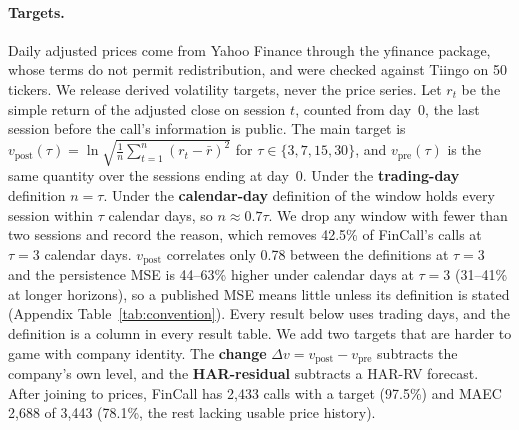 \paragraph{Targets.}
Daily adjusted prices come from Yahoo Finance through the yfinance package,
whose terms do not permit redistribution, and were checked against
Tiingo on 50 tickers. We release derived volatility targets, never the price
series. Let $r_t$ be the simple return of the adjusted close on session $t$, counted from day~0, the last
session before the call's information is public. The main target is
$v_{\mathrm{post}}(\tau)=\ln\sqrt{\frac{1}{n}\sum_{t=1}^{n}(r_t-\bar r)^2}$ for
$\tau\in\{3,7,15,30\}$, and $v_{\mathrm{pre}}(\tau)$ is the same quantity over the
sessions ending at day~0. Under the \textbf{trading-day} definition $n=\tau$. Under
the \textbf{calendar-day} definition of \citet{qin2019what} the window holds every
session within $\tau$ calendar days, so $n\approx0.7\tau$. We drop any window
with fewer than two sessions and record the reason, which removes 42.5\% of
FinCall's calls at $\tau{=}3$ calendar days. $v_{\mathrm{post}}$ correlates only
0.78 between the definitions at $\tau{=}3$ and the persistence MSE is 44--63\%
higher under calendar days at $\tau{=}3$ (31--41\% at longer horizons), so a published MSE means little unless its
definition is stated (Appendix Table~\ref{tab:convention}). Every result below
uses trading days, and the definition is a column in every result table. We add two targets
that are harder to game with company identity. The \textbf{change}
$\Delta v=v_{\mathrm{post}}-v_{\mathrm{pre}}$ subtracts the company's own level,
and the \textbf{HAR-residual} subtracts a HAR-RV forecast. After joining to
prices, FinCall has 2{,}433 calls with a target (97.5\%) and MAEC 2{,}688 of 3{,}443
(78.1\%, the rest lacking usable price history).

